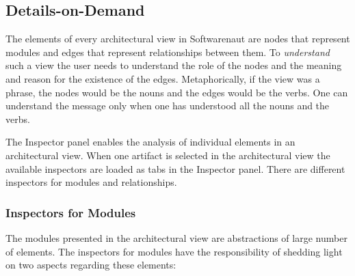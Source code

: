 \documentclass[preprint,12pt]{elsarticle}
\newcommand\on[1]{\nbc{ON}{#1}{red}} %
\begin{document}

\subsection {Details-on-Demand} 

The elements of every architectural view in Softwarenaut are nodes that represent modules and edges that represent relationships between them. To {\em understand} such a view the user needs to understand the role of the nodes and the meaning and reason for the existence of the edges. Metaphorically, if the view was a phrase, the nodes would be the nouns and the edges would be the verbs. One can understand the message only when one has understood all the nouns and the verbs.

The Inspector panel enables the analysis of individual elements in an architectural view. When one artifact is selected in the architectural view the available inspectors are loaded as tabs in the Inspector panel. There are different inspectors for modules and relationships. 



\subsubsection {Inspectors for Modules}

The modules presented in the architectural view are abstractions of large number of elements. The inspectors for modules have the responsibility of shedding light on two aspects regarding these elements:

\end{document}
